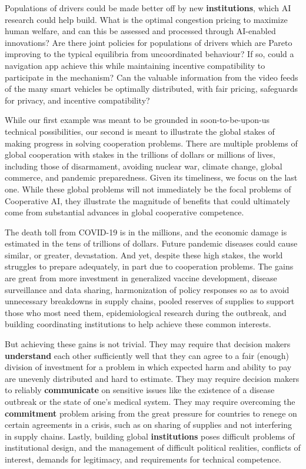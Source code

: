 \documentclass[11pt, a4paper, logo, onecolumn, nonumbering]{deepmind}
\newcommand{\bnote}[1]{}
\begin{document}
Populations of drivers could be made better off by new \textbf{institutions}, which AI research could help build. What is the optimal congestion pricing to maximize human welfare, and can this be assessed and processed through AI-enabled innovations? Are there joint policies for populations of drivers which are Pareto improving to the typical equilibria from uncoordinated behaviour? If so, could a navigation app achieve this while maintaining incentive compatibility to participate in the mechanism? Can the valuable information from the video feeds of the many smart vehicles be optimally distributed, with fair pricing, safeguards for privacy, and incentive compatibility? 


While our first example was meant to be grounded in soon-to-be-upon-us technical possibilities, our second is meant to illustrate the global stakes of making progress in solving cooperation problems. There are multiple problems of global cooperation with stakes in the trillions of dollars or millions of lives, including those of disarmament, avoiding nuclear war, climate change, global commerce, and pandemic preparedness. Given its timeliness, we focus on the last one. While these global problems will not immediately be the focal problems of Cooperative AI, they illustrate the magnitude of benefits that could ultimately come from substantial advances in global cooperative competence. 

\bnote{Role of AI in this example is not spelled out. We can't fix that now, but for the future would be better to have an example with a more compelling role of AI.}
The death toll from COVID-19 is in the millions, and the economic damage is estimated in the tens of trillions of dollars. Future pandemic diseases could cause similar, or greater, devastation. And yet, despite these high stakes, the world struggles to prepare adequately, in part due to cooperation problems. The gains are great from more investment in generalized vaccine development, disease surveillance and data sharing, harmonization of policy responses so as to avoid unnecessary breakdowns in supply chains, pooled reserves of supplies to support those who most need them, epidemiological research during the outbreak, and building coordinating institutions to help achieve these common interests. 

But achieving these gains is not trivial. They may require that decision makers \textbf{understand} each other sufficiently well that they can agree to a fair (enough) division of investment for a problem in which expected harm and ability to pay are unevenly distributed and hard to estimate. They may require decision makers to reliably \textbf{communicate} on sensitive issues like the existence of a disease outbreak or the state of one's medical system. They may require overcoming the \textbf{commitment} problem arising from the great pressure for countries to renege on certain agreements in a crisis, such as on  sharing of supplies and not interfering in supply chains. Lastly, building global \textbf{institutions} poses difficult problems of institutional design, and the management of difficult political realities, conflicts of interest, demands for legitimacy, and requirements for technical competence. 
\end{document}
